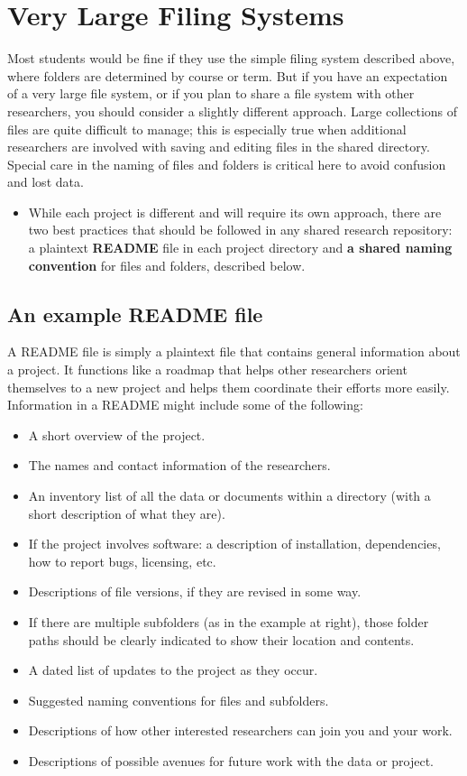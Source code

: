 \section{Very Large Filing Systems}

Most students would be fine if they use the simple filing system described above, where folders are determined by course or term. But if you have an expectation of a very large file system, or if you plan to share a file system with other researchers, you should consider a slightly different approach. Large collections of files are quite difficult to manage; this is especially true when additional researchers are involved with saving and editing files in the shared directory. Special care in the naming of files and folders is critical here to avoid confusion and lost data. 

\begin{itemize}
\item While each project is different and will require its own approach, there are two best practices that should be followed in any shared research repository: a plaintext \textbf{README} file in each project directory and \textbf{a shared naming convention} for files and folders, described below.  
\end{itemize}

\subsection{An example README file}

A README file is simply a plaintext file that contains general information about a project. It functions like a roadmap that helps other researchers orient themselves to a new project and helps them coordinate their efforts more easily.  Information in a README might include some of the following:

\begin{itemize}
\item A short overview of the project.
\item The names and contact information of the researchers.
\item An inventory list of all the data or documents within a directory (with a short description of what they are). 
\item If the project involves software: a description of installation, dependencies, how to report bugs, licensing, etc.
\item Descriptions of file versions, if they are revised in some way.
\item If there are multiple subfolders (as in the example at right), those folder paths should be clearly indicated to show their location and contents.
\item A dated list of updates to the project as they occur. 
\item Suggested naming conventions for files and subfolders.
\item Descriptions of how other interested researchers can join you and your work.
\item Descriptions of possible avenues for future work with the data or project.

\end{itemize}

